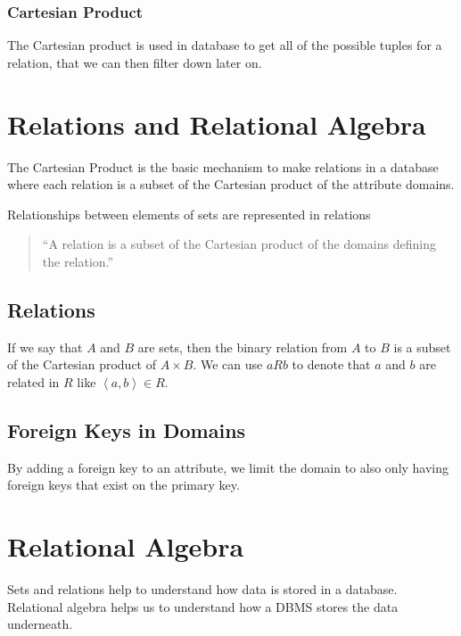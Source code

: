 \subsubsection{Cartesian Product}\label{ssub:cartesian_product}

The Cartesian product is used in database to get all of the possible tuples for  a relation, that we can then filter down later on.

\section{Relations and Relational Algebra}\label{sec:relations_and_relational_algebra}

The Cartesian Product is the basic mechanism to make relations in a database where each relation is a subset of the Cartesian product of the attribute domains.

Relationships between elements of sets are represented in relations

\begin{quote}
    ``A relation is a subset of the Cartesian product of the domains defining the relation.''
\end{quote}

\subsection{Relations}\label{sub:relationsdsr61}

If we say that \(A\) and \(B\) are sets, then the binary relation from \(A\) to \(B\) is a subset of the Cartesian product of \(A \times B\).
We can use \(a R b\) to denote that \(a\) and \(b\) are related in \(R\) like \(\left<a, b\right> \in R\).

\subsection{Foreign Keys in Domains}\label{sub:foreign_keys_in_domains}

By adding a foreign key to an attribute, we limit the domain to also only having foreign keys that exist on the primary key.

\section{Relational Algebra}\label{sec:relational_algebra}

Sets and relations help to understand how data is stored in a database.
Relational algebra helps us to understand how a DBMS stores the data underneath.

